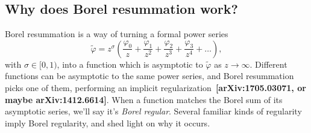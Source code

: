 \documentclass{article}
\newcommand{\series}{\tilde}
\begin{document}
\color{DarkBlue}
\subsection{Why does Borel resummation work?}
Borel resummation is a way of turning a formal power series
\[ \series{\varphi} = z^\sigma \left( \frac{\varphi_0}{z} + \frac{\varphi_1}{z^2} + \frac{\varphi_2}{z^3} + \frac{\varphi_3}{z^4} + \ldots \right), \]
with $\sigma \in [0, 1)$, into a function which is asymptotic to $\series{\varphi}$ as $z \to \infty$. Different functions can be asymptotic to the same power series, and Borel resummation picks one of them, performing an implicit regularization~\textbf{[arXiv:1705.03071, or maybe arXiv:1412.6614]}. When a function matches the Borel sum of its asymptotic series, we'll say it's {\em Borel regular}. Several familiar kinds of regularity imply Borel regularity, and shed light on why it occurs.
\end{document}
